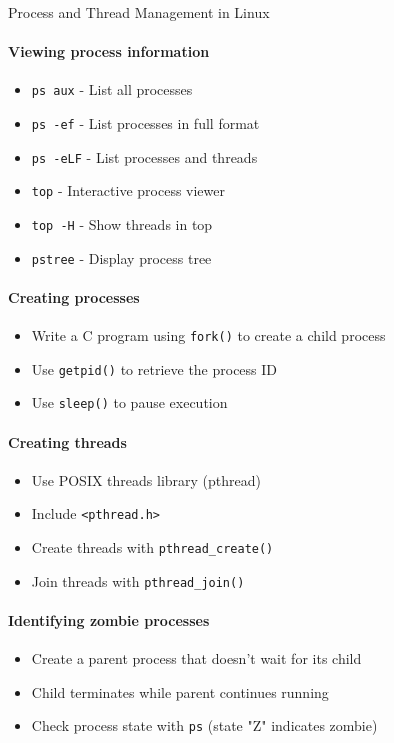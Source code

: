 \begin{KR}{Process and Thread Management in Linux}
    \paragraph{Viewing process information}
    \begin{itemize}
        \item \texttt{ps aux} - List all processes
        \item \texttt{ps -ef} - List processes in full format
        \item \texttt{ps -eLF} - List processes and threads
        \item \texttt{top} - Interactive process viewer
        \item \texttt{top -H} - Show threads in top
        \item \texttt{pstree} - Display process tree
    \end{itemize}
    
    \paragraph{Creating processes}
    \begin{itemize}
        \item Write a C program using \texttt{fork()} to create a child process
        \item Use \texttt{getpid()} to retrieve the process ID
        \item Use \texttt{sleep()} to pause execution
    \end{itemize}
    
    \paragraph{Creating threads}
    \begin{itemize}
        \item Use POSIX threads library (pthread)
        \item Include \texttt{<pthread.h>}
        \item Create threads with \texttt{pthread\_create()}
        \item Join threads with \texttt{pthread\_join()}
    \end{itemize}
    
    \paragraph{Identifying zombie processes}
    \begin{itemize}
        \item Create a parent process that doesn't wait for its child
        \item Child terminates while parent continues running
        \item Check process state with \texttt{ps} (state "Z" indicates zombie)
    \end{itemize}
\end{KR}

